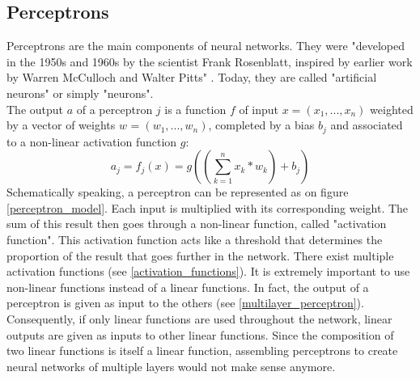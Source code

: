\subsection{Perceptrons}
\label{perceptron}
\setlength{\marginparwidth}{3cm}\leavevmode {}Perceptrons are the main components of neural networks. They were "developed in the 1950s and 1960s by the scientist Frank Rosenblatt, inspired by earlier work by Warren McCulloch and Walter Pitts" \cite{13}. Today, they are called "artificial neurons" or simply "neurons".\\
The output $a$ of a perceptron $j$ is a function $f$ of input $x=(x_{1}, ..., x_{n})$ weighted by a vector of weights $w_{}=(w_{1}, ..., w_{n})$, completed by a bias $b_{j}$ and associated to a non-linear activation function $g$:
\begin{equation}
\label{perceptron_equation}
a_{j} = f_{j}(x) = g((\sum_{k=1}^{n} x_{k} * w_{k}) + b_{j})
\end{equation}
Schematically speaking, a perceptron can be represented as on figure \ref{perceptron_model}. Each input is multiplied with its corresponding weight. The sum of this result then goes through a non-linear function, called "activation function". This activation function acts like a threshold that determines the proportion of the result that goes further in the network. There exist multiple activation functions (see \ref{activation_functions}). It is extremely important to use non-linear functions instead of a linear functions. In fact, the output of a perceptron is given as input to the others (see \ref{multilayer_perceptron}). Consequently, if only linear functions are used throughout the network, linear outputs are given as inputs to other linear functions. Since the composition of two linear functions is itself a linear function, assembling perceptrons to create neural networks of multiple layers would not make sense anymore.





